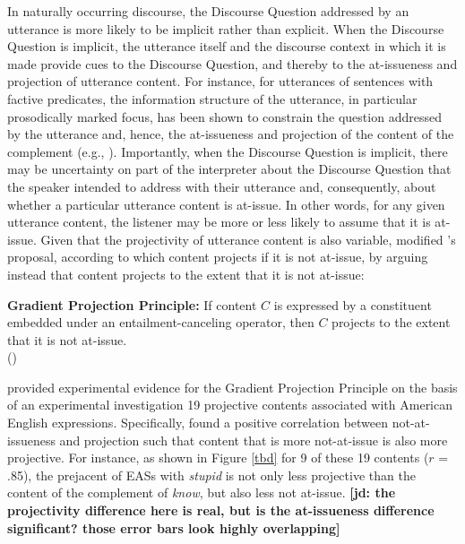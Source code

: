 \documentclass[11pt,fleqn]{article}
\newcommand{\6}{\mbox{$[\hspace*{-.6mm}[$}}
\newcommand{\9}{\mbox{$]\hspace*{-.6mm}]$}}
\newcommand{\citepos}[1]{\citeauthor{#1}'s \citeyear{#1}}
\newcommand{\jd}[1]{\textbf{\color{red}[jd: #1]}}
\begin{document}
In naturally occurring discourse, the Discourse Question addressed by an utterance is more likely to be implicit rather than explicit. When the Discourse Question is implicit, the utterance itself and the discourse context in which it is made provide cues to the Discourse Question, and thereby to the at-issueness and projection of utterance content. For instance, for utterances of sentences with factive predicates, the information structure of the utterance, in particular prosodically marked focus, has been shown to constrain the question addressed by the utterance and, hence, the at-issueness and projection of the content of the complement (e.g., \citealt{beaver01,cummins-rohde2015,tonhauser-salt26,best-question,djaerv-bacovcin-salt27,mahler-nels}). Importantly, when the Discourse Question is implicit, there may be uncertainty on part of the interpreter about the Discourse Question that the speaker intended to address with their utterance and, consequently, about whether a particular utterance content is at-issue. In other words, for any given utterance content, the listener may be more or less likely to assume that it is at-issue. Given that the projectivity of utterance content is also variable, \citealt{tbd-variability} modified \citepos{best-question} proposal, according to which content projects if it is not at-issue, by arguing instead that content projects to the extent that it is not at-issue:

\begin{exe}
\ex\label{gpp} {\bf Gradient Projection Principle:} If content $C$ is expressed by a constituent embedded under an entailment-canceling operator, then $C$ projects to the extent that it is not at-issue. \\ \hspace*{.2cm} \hfill (\citealt[499]{tbd-variability})
\end{exe}

\citealt{tbd-variability} provided experimental evidence for the Gradient Projection Principle on the basis of an experimental investigation 19 projective contents associated with American English expressions. Specifically, \citet{tbd-variability} found a positive correlation between not-at-issueness and projection such that content that is more not-at-issue is also more projective. For instance, as shown in Figure \ref{tbd} for 9 of these 19 contents ($r$ = .85), the prejacent of EASs with {\em stupid} is not only less projective than the content of the complement of {\em know}, but also less not at-issue. \jd{the projectivity difference here is real, but is the at-issueness difference significant? those error bars look highly overlapping}
\end{document}
